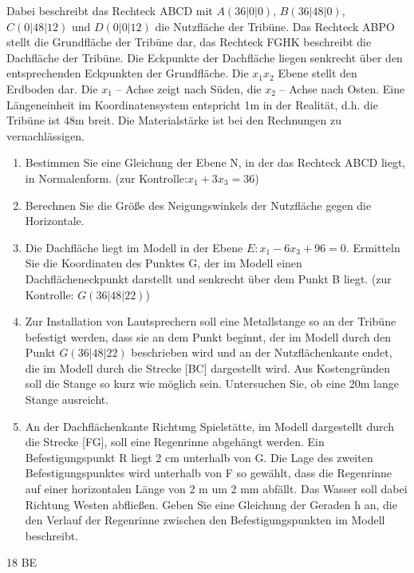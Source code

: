 \documentclass[a4paper,12pt]{article}
\begin{document}
\enlargethispage{2cm}

Dabei beschreibt das Rechteck ABCD mit
  $A (36|0|0)$, $ B (36|48|0)$, $C (0|48|12)$ und $ D (0|0|12) $
die Nutzfläche der Tribüne. Das Rechteck ABPO stellt die Grundfläche der Tribüne dar, das
Rechteck FGHK beschreibt die Dachfläche der Tribüne. Die Eckpunkte der Dachfläche liegen
senkrecht über den entsprechenden Eckpunkten der Grundfläche.
Die $x_1x_2 $  Ebene stellt den Erdboden dar. Die $ x_1$ – Achse zeigt nach Süden, die $x_2$ – Achse nach
Osten. Eine Längeneinheit im Koordinatensystem entspricht 1m in der Realität, d.h. die Tribüne ist
48m breit. Die Materialstärke ist bei den Rechnungen zu vernachlässigen.
\begin{enumerate}[label={\alph*)}]
\item  Bestimmen Sie eine Gleichung der Ebene N, in der das Rechteck ABCD liegt, in
Normalenform. (zur Kontrolle:$ x_1 + 3x_3 = 36 $)
\item Berechnen Sie die Größe des Neigungswinkels der Nutzfläche gegen die Horizontale.
\item Die Dachfläche liegt im Modell in der Ebene $E: x_1 - 6x_3 + 96 = 0.$
Ermitteln Sie die Koordinaten des Punktes G, der im Modell einen Dachflächeneckpunkt
darstellt und senkrecht über dem Punkt B liegt. (zur Kontrolle: $G (36|48|22)$)
\item Zur Installation von Lautsprechern soll eine Metallstange so an der Tribüne befestigt
werden, dass sie an dem Punkt beginnt, der im Modell durch den Punkt $G (36|48|22)$  beschrieben wird
und an der Nutzflächenkante endet, die im Modell durch die Strecke [BC] dargestellt wird.
Aus Kostengründen soll die Stange so kurz wie möglich sein. Untersuchen Sie, ob eine 20m
lange Stange ausreicht.
\item An der Dachflächenkante Richtung Spielstätte, im Modell dargestellt durch die Strecke
[FG], soll eine Regenrinne abgehängt werden. Ein Befestigungspunkt R liegt 2 cm
unterhalb von G. Die Lage des zweiten Befestigungspunktes wird unterhalb von F so
gewählt, dass die Regenrinne auf einer horizontalen Länge von 2 m um 2 mm abfällt. Das
Wasser soll dabei Richtung Westen abfließen. Geben Sie eine Gleichung der Geraden h an,
die den Verlauf der Regenrinne zwischen den Befestigungspunkten im Modell beschreibt.
\end{enumerate}


\begin{flushright}18 BE \end{flushright}









\end{document}
